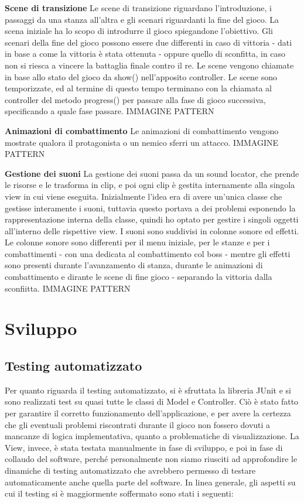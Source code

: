 \documentclass[a4paper,12pt]{report}
\begin{document}
\textbf{Scene di transizione}
Le scene di transizione riguardano l'introduzione, i passaggi da una stanza all'altra e gli scenari riguardanti la fine del gioco.
La scena iniziale ha lo scopo di introdurre il gioco spiegandone l'obiettivo. Gli scenari della fine del gioco possono essere due
differenti in caso di vittoria - dati in base a come la vittoria è stata ottenuta - oppure quello di sconfitta, in caso non si riesca
a vincere la battaglia finale contro il re.
Le scene vengono chiamate in base allo stato del gioco da show() nell'apposito controller. Le scene sono temporizzate, ed al termine
di questo tempo terminano con la chiamata al controller del metodo progress() per passare alla fase di gioco successiva, specificando
a quale fase passare.
IMMAGINE
PATTERN

\textbf{Animazioni di combattimento}
Le animazioni di combattimento vengono mostrate qualora il protagonista o un nemico sferri un attacco. 
IMMAGINE
PATTERN

\textbf{Gestione dei suoni}
La gestione dei suoni passa da un sound locator, che prende le risorse e le trasforma in clip, e poi ogni clip è gestita internamente
alla singola view in cui viene eseguita. 
Inizialmente l'idea era di avere un'unica classe che gestisse interamente i suoni, tuttavia questo portava a dei problemi esponendo
la rappresentazione interna della classe, quindi ho optato per gestire i singoli oggetti all'interno delle rispettive view. 
I suoni sono suddivisi in colonne sonore ed effetti. Le colonne sonore sono differenti per il menu iniziale, per le stanze e per i combattimenti
- con una dedicata al combattimento col boss - mentre gli effetti sono presenti durante l'avanzamento di stanza, durante le animazioni di combattimento
e dirante le scene di fine gioco - separando la vittoria dalla sconfiitta.
IMMAGINE
PATTERN


\chapter{Sviluppo}
\section{Testing automatizzato}

Per quanto riguarda il testing automatizzato, si è sfruttata la libreria JUnit e si sono realizzati test su quasi tutte le classi di Model e Controller. Ciò è stato fatto per garantire il corretto funzionamento dell’applicazione, e per avere la certezza che gli eventuali problemi riscontrati durante il gioco non fossero dovuti a mancanze di logica implementativa, quanto a problematiche di visualizzazione. 
%
\newline La View, invece, è stata testata manualmente in fase di sviluppo, e poi in fase di collaudo del software, perché personalmente non siamo riusciti ad approfondire le dinamiche di testing automatizzato che avrebbero permesso di testare automaticamente anche quella parte del software.
%
\newline In linea generale, gli aspetti su cui il testing si è maggiormente soffermato sono stati i seguenti:
\end{document}
